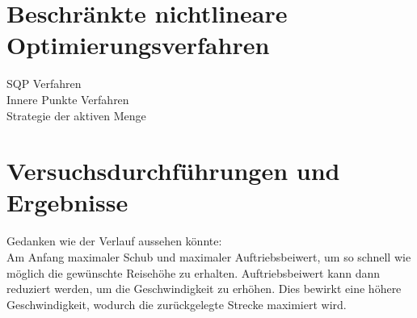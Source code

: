 














\section{Beschränkte nichtlineare Optimierungsverfahren}
SQP Verfahren \\
Innere Punkte Verfahren \\
Strategie der aktiven Menge













\section{Versuchsdurchführungen und Ergebnisse}
Gedanken wie der Verlauf aussehen könnte:\\
Am Anfang maximaler Schub und maximaler Auftriebsbeiwert, um so schnell wie möglich die gewünschte Reisehöhe zu erhalten. Auftriebsbeiwert kann dann reduziert werden, um die Geschwindigkeit zu erhöhen. Dies bewirkt eine höhere Geschwindigkeit, wodurch die zurückgelegte Strecke maximiert wird.



